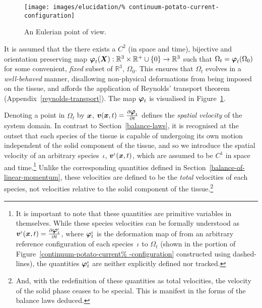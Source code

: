 \begin{figure}
  \centering
  \texttt{[image: images/elucidation/\%
    continuum-potato-current-configuration]}
  \caption{An Eulerian point of view.}
  \label{continuum-potato-current-configuration}
\end{figure}

It is assumed that the there exists a {$\mathit{C}^{2}$} (in space and
time), bijective and orientation preserving map $\mbox{\boldmath$\varphi$}_{t}(\mbox{\boldmath$ X$}):
\mathbb{R}^3\times\mathbb{R}^{+}\cup\{0\} \rightarrow\mathbb{R}^{3}$
such that $\Omega_{t} = \mbox{\boldmath$\varphi$}_{t} (\Omega_{0})$ for some
convenient, {\em fixed} subset of $\mathbb{R}^{3}$, $\Omega_{0}$. This
ensures that $\Omega_{t}$ evolves in a {\em well-behaved} manner,
disallowing non-physical deformations from being imposed on the
tissue, and affords the application of Reynolds' transport theorem
(Appendix~\ref{reynolds-transport}). The map $\mbox{\boldmath$\varphi$}_{t}$ is
visualised in Figure~\ref{continuum-potato-current-configuration}.

Denoting a point in $\Omega_{t}$ by $\mbox{\boldmath$ x$}$, $\mbox{\boldmath$ v$}(\mbox{\boldmath$ x$},t) =
\frac{\partial \mbox{\boldmath$\varphi$}_{t}}{\partial t}$ defines the {\em spatial
  velocity} of the system domain. In contrast to
Section~\ref{balance-laws}, it is recognised at the outset that each
species of the tissue is capable of undergoing its own motion
independent of the solid component of the tissue, and so we introduce
the spatial velocity of an arbitrary species~$\iota$,
$\mbox{\boldmath$ v$}^{\iota}(\mbox{\boldmath$ x$},t)$, which are assumed to be $\mathit{C}^{1}$ in
space and time.\footnote{It is important to note that these quantities
  are primitive variables in themselves. While these species
  velocities can be formally understood as \mbox{$\mbox{\boldmath$ v$}^{\iota}(\mbox{\boldmath$ x$},t) =
    \frac{\partial \mbox{\boldmath$\varphi$}^{\iota}_{t}}{\partial t}$}, where
  $\mbox{\boldmath$\varphi$}^{\iota}_{t}$ is the deformation map of from an arbitrary
  reference configuration of each species~$\iota$ to $\Omega_{t}$
  (shown in the portion of Figure~\ref{continuum-potato-current%
    -configuration} constructed using dashed-lines), the quantities
  $\mbox{\boldmath$\varphi$}^{\iota}_{t}$ are neither explicitly defined nor tracked.}
Unlike the corresponding quantities defined in
Section~\ref{balance-of-linear-momentum}, these velocities are defined
to be the {\em total} velocities of each species, not velocities
relative to the solid component of the tissue.\footnote{And, with the
  redefinition of these quantities as total velocities, the velocity
  of the solid phase ceases to be special. This is manifest in the
  forms of the balance laws deduced.}

